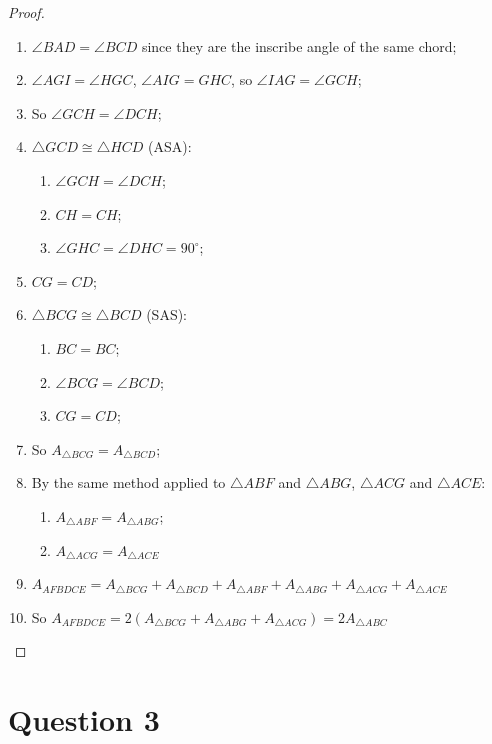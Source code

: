 \documentclass{article}
\begin{document}
\begin{proof}
~
    \begin{enumerate}
        \item $\angle BAD=\angle BCD$ since they are the inscribe angle of the same chord;
        \item $\angle AGI=\angle HGC$, $\angle AIG=GHC$, so $\angle IAG=\angle GCH$;
        \item So $\angle GCH=\angle DCH$;
        \item $\triangle GCD\cong \triangle HCD$ (ASA):
        \begin{enumerate}
            \item $\angle GCH=\angle DCH$;
            \item $CH=CH$;
            \item $\angle GHC=\angle DHC=90^\circ$;
        \end{enumerate}
        \item $CG=CD$;
        \item $\triangle BCG\cong \triangle BCD$ (SAS):
        \begin{enumerate}
            \item $BC=BC$;
            \item $\angle BCG=\angle BCD$;
            \item $CG=CD$;
        \end{enumerate}
        \item So $A_{\triangle BCG}=A_{\triangle BCD}$;
        \item By the same method applied to $\triangle ABF$ and $\triangle ABG$, $\triangle ACG$ and $\triangle ACE$:
        \begin{enumerate}
            \item $A_{\triangle ABF}=A_{\triangle ABG}$;
            \item $A_{\triangle ACG}=A_{\triangle ACE}$
        \end{enumerate}
        \item $A_{AFBDCE}=A_{\triangle BCG}+A_{\triangle BCD}+A_{\triangle ABF}+A_{\triangle ABG}+A_{\triangle ACG}+A_{\triangle ACE}$
        \item So $A_{AFBDCE}= 2(A_{\triangle BCG}+A_{\triangle ABG}+A_{\triangle ACG})=2A_{\triangle ABC}$
    \end{enumerate}
\end{proof}

\newpage

\section*{Question 3}
\end{document}
